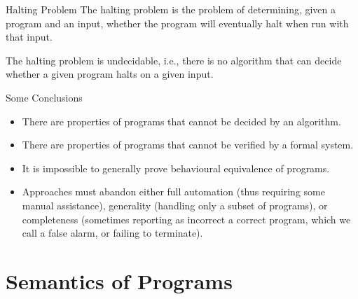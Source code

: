 \documentclass{beamer}
\begin{document}
        \begin{frame}{Halting Problem}
          The halting problem is the problem of determining, given a program and an input, whether the program will eventually halt when run with that input.
          
          The halting problem is undecidable, i.e., there is no algorithm that can decide whether a given program halts on a given input.
        \end{frame}

        \begin{frame}{Some Conclusions}
          \begin{itemize}
            \item There are properties of programs that cannot be decided by an algorithm. 
            \item There are properties of programs that cannot be verified by a formal system.
            \item It is impossible to generally prove behavioural equivalence of programs.
            \item Approaches must abandon either full automation (thus requiring some manual assistance), generality (handling only a subset of programs), or completeness (sometimes reporting as incorrect a correct program, which we call a false alarm, or failing to terminate).
          \end{itemize}
        
          
        \end{frame}
\section{Semantics of Programs}
\end{document}

